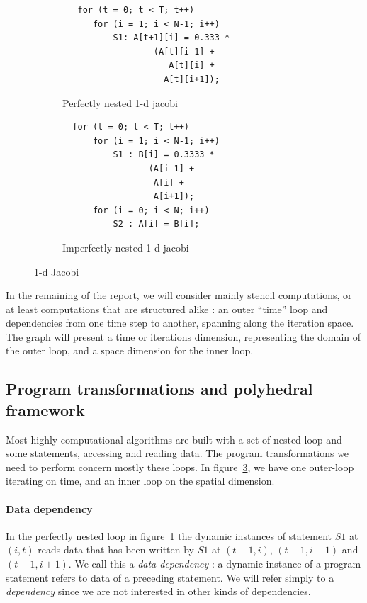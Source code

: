 \documentclass[a4paper,11pt]{article}
\begin{document}
\begin{figure}
 \begin{subfigure}{.5\textwidth}
  \begin{verbatim}
   for (t = 0; t < T; t++)
      for (i = 1; i < N-1; i++)
          S1: A[t+1][i] = 0.333 *
                  (A[t][i-1] +
                     A[t][i] +
                    A[t][i+1]);
  \end{verbatim}
  \caption{Perfectly nested 1-d jacobi}
  \label{jbi1d_code:naive} 
 \end{subfigure}
 \begin{subfigure}{.5\textwidth}
  \begin{verbatim}
  for (t = 0; t < T; t++)
      for (i = 1; i < N-1; i++)
          S1 : B[i] = 0.3333 * 
                 (A[i-1] + 
                  A[i] + 
                  A[i+1]);
      for (i = 0; i < N; i++)
          S2 : A[i] = B[i];   
  \end{verbatim}
  \caption{Imperfectly nested 1-d jacobi}
  \label{jbi1d_code:mem}
 \end{subfigure}
 \caption{1-d Jacobi}
 \label{jbi1d_code}
\end{figure}

In the remaining of the report, we will consider mainly stencil computations, or at least 
computations that are structured alike : an outer “time” loop and dependencies from 
one time step to another, spanning along the iteration space. The graph will present a 
time or iterations dimension, representing the domain of the outer loop, and a space dimension
for the inner loop.


\subsection{Program transformations and polyhedral framework}
Most highly computational algorithms are built with a set of nested loop and some statements, 
accessing and reading data. The program transformations we need to perform
concern mostly these loops. In figure~\ref{jbi1d_code}, we have one outer-loop iterating on 
time, and an inner loop on the spatial dimension.
\paragraph{Data dependency} In the perfectly nested loop in figure~\ref{jbi1d_code:naive} the
dynamic instances of statement $S1$ at $(i, t)$ reads data that has been written by $S1$ at 
$(t − 1, i)$, $(t − 1, i − 1)$ and $(t − 1, i + 1)$. We call this a \textit{data dependency} :
a dynamic instance of a program statement refers to data of a preceding statement. We will refer 
simply to a \textit{dependency} since we are not interested in other kinds of dependencies.
\end{document}
